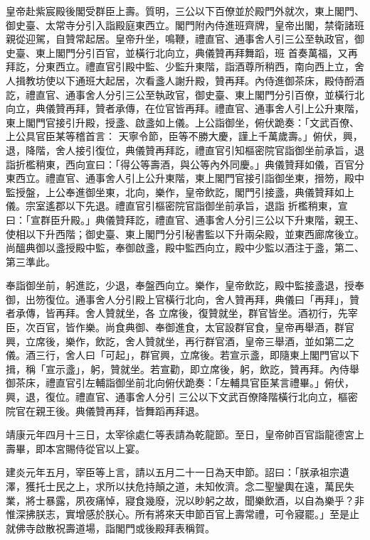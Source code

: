 \begin{pinyinscope}
 皇帝赴紫宸殿後閣受群臣上壽。質明，三公以下百僚並於殿門外就次，東上閣門、御史臺、太常寺分引入詣殿庭東西立。閣門附內侍進班齊牌，皇帝出閣，禁衛諸班親從迎駕，自贊常起居。皇帝升坐，鳴鞭，禮直官、通事舍人引三公至執政官，御史臺、東上閣門分引百官，並橫行北向立，典儀贊再拜舞蹈，班
 首奏萬福，又再拜訖，分東西立。禮直官引殿中監、少監升東階，詣酒尊所稍西，南向西上立，舍人揖教坊使以下通班大起居，次看盞人謝升殿，贊再拜。內侍進御茶床，殿侍酹酒訖，禮直官、通事舍人分引三公至執政官，御史臺、東上閣門分引百僚，並橫行北向立，典儀贊再拜，贊者承傳，在位官皆再拜。禮直官、通事舍人引上公升東階，東上閣門官接引升殿，授盞、啟盞如上儀。上公詣御坐，俯伏跪奏：「文武百僚、上公具官臣某等稽首言：
 天寧令節，臣等不勝大慶，謹上千萬歲壽。」俯伏，興，退，降階，舍人接引復位，典儀贊再拜訖，禮直官引知樞密院官詣御坐前承旨，退詣折檻稍東，西向宣曰：「得公等壽酒，與公等內外同慶。」典儀贊拜如儀，百官分東西立。禮直官、通事舍人引上公升東階，東上閣門官接引詣御坐東，搢笏，殿中監授盤，上公奉進御坐東，北向，樂作，皇帝飲訖，閣門引接盞，典儀贊拜如上儀。宗室遙郡以下先退。禮直官引樞密院官詣御坐前承旨，退詣
 折檻稍東，宣曰：「宣群臣升殿。」典儀贊拜訖，禮直官、通事舍人分引三公以下升東階，親王、使相以下升西階；御史臺、東上閣門分引秘書監以下升兩朵殿，並東西廊席後立。尚醞典御以盞授殿中監，奉御啟盞，殿中監西向立，殿中少監以酒注于盞，第二、第三準此。



 奉詣御坐前，躬進訖，少退，奉盤西向立。樂作，皇帝飲訖，殿中監接盞退，授奉御，出笏復位。通事舍人分引殿上官橫行北向，舍人贊再拜，典儀曰「再拜」，贊者承傳，皆再拜。舍人贊就坐，各
 立席後，復贊就坐，群官皆坐。酒初行，先宰臣，次百官，皆作樂。尚食典御、奉御進食，太官設群官食，皇帝再舉酒，群官興，立席後，樂作，飲訖，舍人贊就坐，再行群官酒，皇帝三舉酒，並如第二之儀。酒三行，舍人曰「可起」，群官興，立席後。若宣示盞，即隨東上閣門官以下揖，稱「宣示盞」，躬，贊就坐。若宣勸，即立席後，躬，飲訖，贊再拜。內侍舉御茶床，禮直官引左輔詣御坐前北向俯伏跪奏：「左輔具官臣某言禮畢。」俯伏，興，退，復位。禮直官、通事舍人分引
 三公以下文武百僚降階橫行北向立，樞密院官在親王後。典儀贊再拜，皆舞蹈再拜退。



 靖康元年四月十三日，太宰徐處仁等表請為乾龍節。至日，皇帝帥百官詣龍德宮上壽畢，即本宮賜侍從官以上宴。



 建炎元年五月，宰臣等上言，請以五月二十一日為天申節。詔曰：「朕承祖宗遺澤，獲托士民之上，求所以扶危持顛之道，未知攸濟。念二聖鑾輿在遠，萬民失業，將士暴露，夙夜痛悼，寢食幾廢，況以眇躬之故，聞樂飲酒，以自為樂乎？非
 惟深拂朕志，實增感於朕心。所有將來天申節百官上壽常禮，可令寢罷。」至是止就佛寺啟散祝壽道場，詣閣門或後殿拜表稱賀。




\end{pinyinscope}
